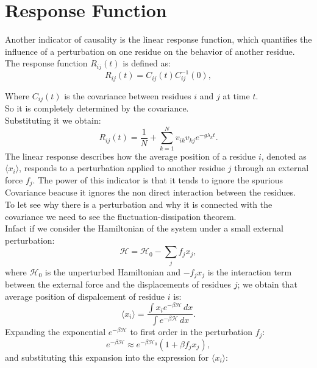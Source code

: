 \documentclass[English, Lau, oneside]{sapthesis}
\begin{document}
\section{Response Function}
\noindent Another indicator of causality is the linear response function, which quantifies the influence of a perturbation on one residue on the behavior of another residue.\\
The response function \(R_{ij}(t)\) is defined as:\cite{ref13}
\begin{equation}
    R_{ij}(t) = {C_{ij}(t)}{C^{-1}_{ij}(0)},
\end{equation}

Where \(C_{ij}(t)\) is the covariance between residues \(i\) and \(j\) at time \(t\).\\
So it is completely determined by the covariance.\\
Substituting it we obtain:
\[
R_{ij}(t) = \frac{1}{N}+{\sum_{k=1}^N  v_{ik} v_{kj} e^{-g \lambda_k t}}.
\]
The linear response describes how the average position of a residue $i$, denoted as $\langle {x}_i \rangle$, responds to a perturbation applied to another residue $j$ through an external force $f_j$. 
The power of this indicator is that it tends to ignore the spurious Covariance beacuse it ignores the non direct interaction between the residues.\\
To let see why there is a perturbation and why it is connected with the covariance we need to see the fluctuation-dissipation theorem.\\
Infact if we consider the Hamiltonian of the system under a small external perturbation:
\begin{equation}
    \mathcal{H} = \mathcal{H}_0 - \sum_j f_j {x}_j,
\end{equation}
where $\mathcal{H}_0$ is the unperturbed Hamiltonian and $-f_j {x}_j$ is the interaction term between the external force and the displacements of residues $j$;
we obtain that average position of dispalcement of residue $i$ is:
\begin{equation}
\langle {x}_i \rangle = \frac{\int {x}_i e^{-\beta \mathcal{H}} \, d{x}}{\int e^{-\beta \mathcal{H}} \, d{x}}.
\end{equation}
Expanding the exponential $e^{-\beta \mathcal{H}}$ to first order in the perturbation $f_j$:
\begin{equation}
e^{-\beta \mathcal{H}} \approx e^{-\beta \mathcal{H}_0} \left( 1 + \beta f_j {x}_j \right),
\end{equation}
and substituting this expansion into the expression for $\langle {x}_i \rangle$:
\end{document}
